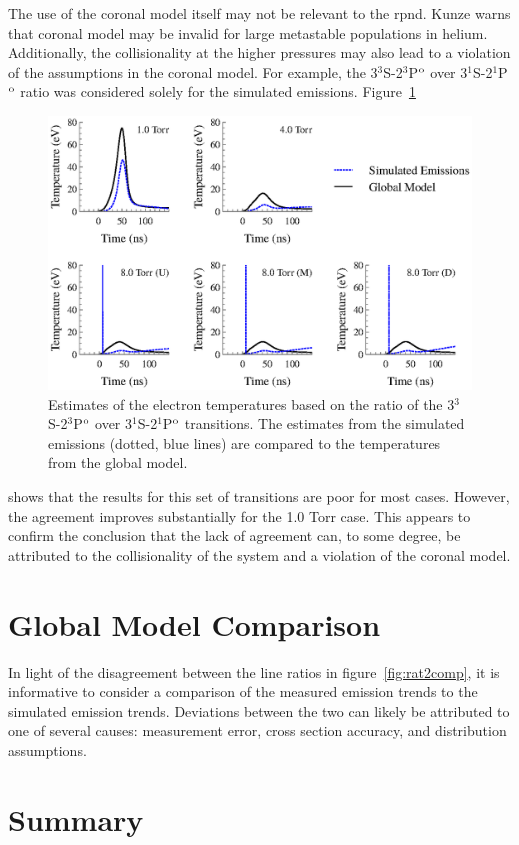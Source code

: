 The use of the coronal model itself may not be relevant to the \acs{rpnd}. Kunze
\cite{Kunze2009} warns that coronal model may be invalid for large metastable
populations in helium. Additionally, the collisionality at the higher pressures
may also lead to a violation of the assumptions in the coronal model. For
example, the 3$^3$S-2$^3$P$^\mathrm{o}$ over 3$^1$S-2$^1$P$^\mathrm{o}$ ratio was considered
solely for the simulated emissions. Figure~\ref{fig:rat1comp}
\begin{figure}
  \centering
  \includegraphics{./chapters/emissions/figures/rat1comp.eps}
  \caption{Estimates of the electron temperatures based on the ratio of the
    3$^3$S-2$^3$P$^\mathrm{o}$ over 3$^1$S-2$^1$P$^\mathrm{o}$ transitions. The estimates from
    the simulated emissions (dotted, blue lines) are compared to the temperatures
    from the global model.}
  \label{fig:rat1comp}
\end{figure}
shows that the results for this set of transitions are poor for most cases.
However, the agreement improves substantially for the 1.0 Torr case. This
appears to confirm the conclusion that the lack of agreement can, to some
degree, be attributed to the collisionality of the system and a violation of the
coronal model.

\section{Global Model Comparison}

In light of the disagreement between the line ratios in
figure~\ref{fig:rat2comp}, it is informative to consider a comparison of the
measured emission trends to the simulated emission trends. Deviations between
the two can likely be attributed to one of several causes: measurement error,
cross section accuracy, and distribution assumptions.


\section{Summary}
